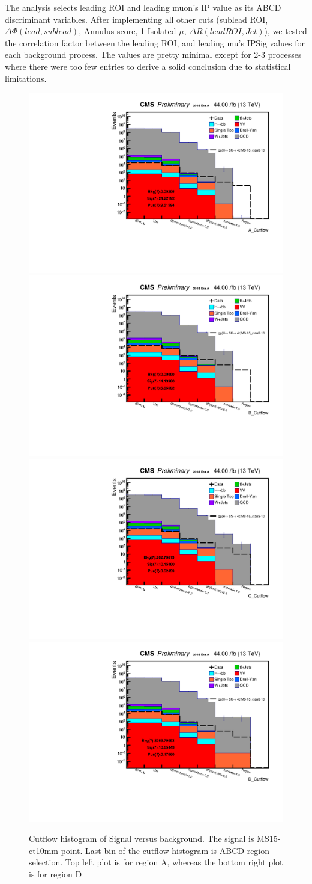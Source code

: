 The analysis selects leading ROI and leading muon's IP value as its ABCD discriminant variables.
After implementing all other cuts (sublead ROI, $\Delta\Phi(lead,sublead)$, Annulus score, 1 Isolated $\mu$, $\Delta R(lead ROI, Jet)$), we tested the correlation factor between the leading ROI, and leading mu's IPSig values for each background process.
The values are pretty minimal except for 2-3 processes where there were too few entries to derive a solid conclusion due to statistical limitations.
 \begin{figure}[h!]
   \caption{Cutflow histogram of Signal versus background. The signal is MS15\GeV-ct10mm point. Last bin of the cutflow histogram is ABCD region selection. Top left plot is for region A, whereas the bottom right plot is for region D}
   \label{fig:ABmethod}
   \centering
   \includegraphics[width=0.47\linewidth]{figs/log_CutflAnalysisNote_MS-15_ctauS-10_A_Cutflow.pdf}
   \includegraphics[width=0.47\linewidth]{figs/log_CutflAnalysisNote_MS-15_ctauS-10_B_Cutflow.pdf}
   \includegraphics[width=0.47\linewidth]{figs/log_CutflAnalysisNote_MS-15_ctauS-10_C_Cutflow.pdf}
   \includegraphics[width=0.47\linewidth]{figs/log_CutflAnalysisNote_MS-15_ctauS-10_D_Cutflow.pdf}
 \end{figure}

